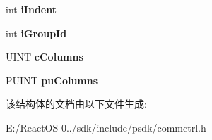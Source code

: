 \begin{DoxyCompactItemize}
\mbox{\label{structtag_l_v_i_t_e_m_w_adbdf029057f21eeed5e9d30cf2af4f5d}} 
int {\bfseries i\+Indent}
\item 
\mbox{\label{structtag_l_v_i_t_e_m_w_a0062e2297c52bb032b5787058ea4707a}} 
int {\bfseries i\+Group\+Id}
\item 
\mbox{\label{structtag_l_v_i_t_e_m_w_a9cf07b48dc335ae809f15a86bcb5d61a}} 
U\+I\+NT {\bfseries c\+Columns}
\item 
\mbox{\label{structtag_l_v_i_t_e_m_w_a8c05b90f5f95a3ce2afd5323691caa83}} 
P\+U\+I\+NT {\bfseries pu\+Columns}
\end{DoxyCompactItemize}


该结构体的文档由以下文件生成\+:\begin{DoxyCompactItemize}
\item 
E\+:/\+React\+O\+S-\/0../sdk/include/psdk/commctrl.\+h\end{DoxyCompactItemize}
